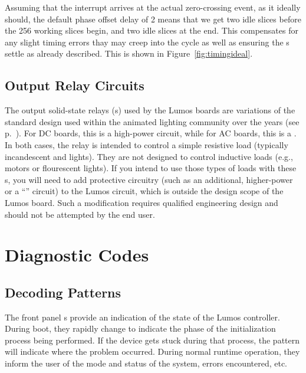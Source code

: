 \documentclass[letterpaper,twoside,onecolumn,openright,final]{memoir}
\begin{document}
Assuming that the interrupt arrives at the actual zero-crossing event, as it ideally should,
the default phase offset delay of 2 means that we get two
idle slices before the 256 working slices begin, and two idle slices at the end.  This compensates for
any slight timing errors thay may creep into the cycle as well as ensuring the s 
settle as already described.  This is shown in Figure~\ref{fig:timingideal}.


\section{Output Relay Circuits}
The output solid-state relays (s) used by the Lumos boards are variations of the standard
 design used within the  animated lighting community over the years (see p.~\pageref{sec:legacy}).  For DC boards, this is a high-power  circuit, while for AC boards, this is a .
In both cases, the relay is intended to control a simple resistive load 
(typically incandescent and 
lights).  They are not designed to control inductive loads (e.g., motors or flourescent lights).  If you intend
to use those types of loads with these s, you will need to add protective circuitry (such as an
additional, higher-power  or a ``'' circuit) to the Lumos circuit, which is outside the
design scope of the Lumos board.  Such a modification requires qualified engineering design and should not be
attempted by the end user.

%

\backmatter
\appendix

\chapter{Diagnostic Codes}
\section{Decoding  Patterns}
The front panel s provide an indication of the state of the Lumos controller.
During boot, they rapidly change to indicate the phase of the initialization process being
performed.  If the device gets stuck during that process, the  pattern will indicate
where the problem occurred.  During normal runtime operation, they inform the user of the
mode and status of the system, errors encountered, etc.
\end{document}
